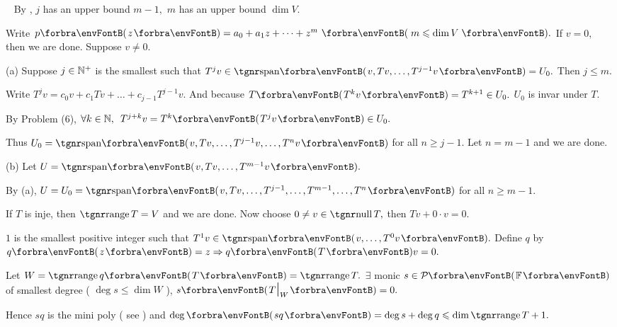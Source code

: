 \documentclass[a4paper, 11pt, UTF8]{article}
\begin{document}
\begin{large}
\par\quad
\Comment\,\,\, By \NOTEFOR [8.40], $j$ has an upper bound $m-1,$ $m$ has an upper bound $\dim V.$\par\quad
Write $p\Par{z}=a_0 +a_1 z+\dots+z^m \,\,\Par{\,m\leqslant \dim V\,}.$ If $v=0,$ then we are done. Suppose $v\neq 0.$\par\quad
(a) Suppose $j\in{\mathbb{N}^+}$ is the smallest such that $T^j v\in\Span{v,Tv,\dots,T^{j-1}v}=U_0.$ Then $j\leqslant m.$\par\quad\Ha
Write $T^j v=c_0 v+c_1 Tv+\dots+c_{j-1}T^{j-1}v.$ And because $T\Par{T^k v}=T^{k+1}\in U_0.$ $U_0$ is invar under $T.$\par\quad\Ha
By Problem (6), $\forall k\in\Nbb,\,\,\,T^{j+k}v=T^k\Par{T^j v}\in U_0.$\par\quad\Ha
Thus $U_0=\Span{v,Tv,\dots,T^{j-1} v,\dots,T^n v}$ for all $n\geqslant j-1.$ Let $n=m-1$ and we are done.\par\quad
(b) Let $U=\Span{v,Tv,\dots,T^{m-1}v}.$\par\quad\Hb
By (a), $U=U_0=\Span{v,Tv,\dots,T^{j-1},\dots,T^{m-1},\dots,T^n}$ for all $n\geqslant m-1.$\PfEnd
\SepLine

\par\quad
If $T$ is inje, then $\range T=V$ and we are done. Now choose $0\neq v\in\null T,$ then $Tv+0\cdot v=0.$\par\quad
$1$ is the smallest positive integer such that $T^1 v\in\Span{v,\dots,T^0 v}.$ Define $q$ by $q\Par{z}=z\Rightarrow q\Par{T}v=0.$\par\quad
Let $W=\range q\Par{T}=\range T.$ $\exists$ monic $s\in\PoF{}$ of smallest degree ( $\deg s\leqslant\dim W$ ), $s\Par{T\mid_W}=0.$\par\quad
Hence $sq$ is the mini poly ( see \NOTEFOR [8.40] ) and $\deg\Par{sq}=\deg s+\deg q\leqslant\dim\range T+1.$\PfEnd
\SepLine


\end{large}
\end{document}
